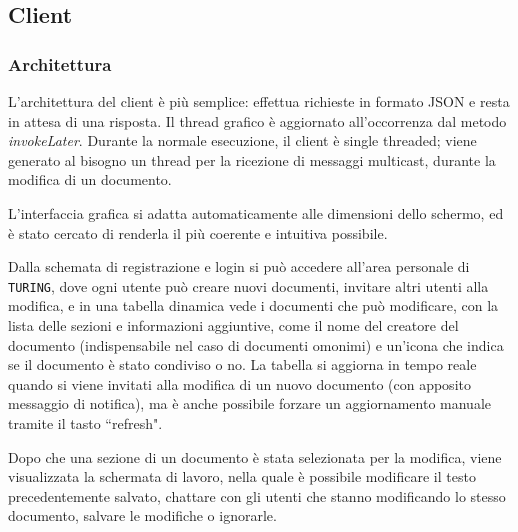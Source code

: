 \subsection{Client}

\subsubsection{Architettura}
L'architettura del client è più semplice: effettua richieste in formato JSON e resta in attesa di una risposta. Il thread grafico è aggiornato all'occorrenza dal metodo \textit{invokeLater}. Durante la normale esecuzione, il client è single threaded; viene generato al bisogno un thread per la ricezione di messaggi multicast, durante la modifica di un documento.

\medskip

L'interfaccia grafica si adatta automaticamente alle dimensioni dello scher\-mo, ed è stato cercato di renderla il più coerente e intuitiva possibile.

\medskip

Dalla schemata di registrazione e login si può accedere all'area personale di \texttt{TURING}, dove ogni utente può creare nuovi documenti, invitare altri utenti alla modifica, e in una tabella dinamica vede i documenti che può modificare, con la lista delle sezioni e informazioni aggiuntive, come il nome del creatore del documento (indispensabile nel caso di documenti omonimi) e un'icona che indica se il documento è stato condiviso o no. La tabella si aggiorna in tempo reale quando si viene invitati alla modifica di un nuovo documento (con apposito messaggio di notifica), ma è anche possibile forzare un aggiornamento manuale tramite il tasto ``refresh".

\medskip

Dopo che una sezione di un documento è stata selezionata per la modifica, viene visualizzata la schermata di lavoro, nella quale è possibile modificare il testo precedentemente salvato, chattare con gli utenti che stanno modificando lo stesso documento, salvare le modifiche o ignorarle.
